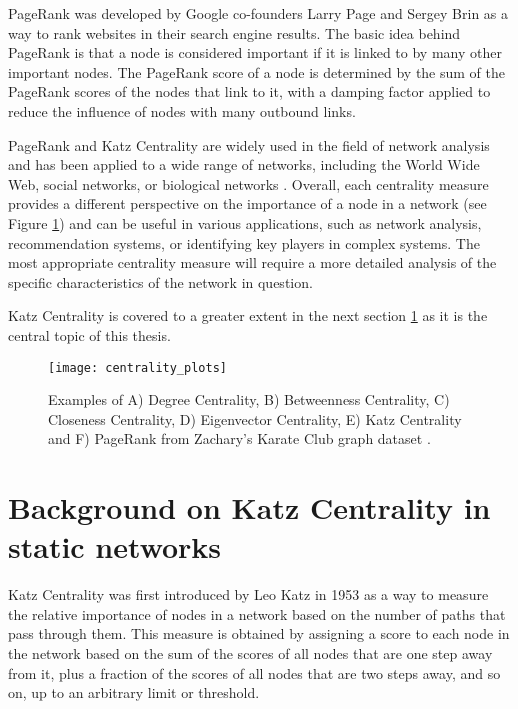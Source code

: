 PageRank was developed by Google co-founders Larry Page and Sergey Brin as a way to rank websites in their search engine results. The basic idea behind PageRank is that a node is considered important if it is linked to by many other important nodes. The PageRank score of a node is determined by the sum of the PageRank scores of the nodes that link to it, with a damping factor applied to reduce the influence of nodes with many outbound links. 

PageRank and Katz Centrality are widely used in the field of network analysis and has been applied to a wide range of networks, including the World Wide Web, social networks, or biological networks \cite{brin1998anatomy,jeong2001lethality,wasserman1994social}. Overall, each centrality measure provides a different perspective on the importance of a node in a network (see Figure \ref{centrality}) and can be useful in various applications, such as network analysis, recommendation systems, or identifying key players in complex systems. The most appropriate centrality measure will require a more detailed analysis of the specific characteristics of the network in question.

Katz Centrality is covered to a greater extent in the next section \ref{sec:back} as it is the central topic of this thesis.

\begin{figure}[h]\centering
	\texttt{[image: centrality\_plots]}
	\caption{Examples of A) Degree Centrality, B) Betweenness Centrality, C) Closeness Centrality, D) Eigenvector Centrality, E) Katz Centrality and F) PageRank from Zachary’s Karate Club graph dataset \cite{zachary1977information}.}
	\label{centrality}
	\bigskip
\end{figure}

\section{Background on Katz Centrality in static networks}
\label{sec:back}

Katz Centrality was first introduced by Leo Katz \cite{katz1953new} in 1953 as a way to measure the relative importance of nodes in a network based on the number of paths that pass through them. This measure is obtained by assigning a score to each node in the network based on the sum of the scores of all nodes that are one step away from it, plus a fraction of the scores of all nodes that are two steps away, and so on, up to an arbitrary limit or threshold.

